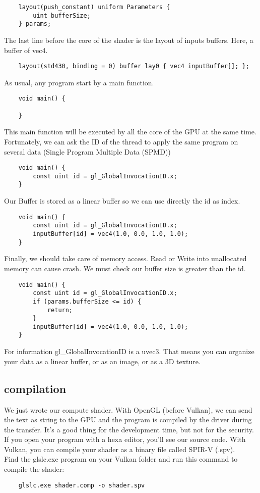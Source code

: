 \documentclass{article}
\begin{document}
\begin{lstlisting}
	layout(push_constant) uniform Parameters {
		uint bufferSize;
	} params;
\end{lstlisting}

The last line before the core of the shader is the layout of inputs buffers. Here, a buffer of vec4.

\begin{lstlisting}
	layout(std430, binding = 0) buffer lay0 { vec4 inputBuffer[]; };
\end{lstlisting}

As usual, any program start by a main function.

\begin{lstlisting}
	void main() {

	}
\end{lstlisting}

This main function will be executed by all the core of the GPU at the same time. Fortunately, we can ask the ID of the thread to apply the same program on several data (Single Program Multiple Data (SPMD))

\begin{lstlisting}
	void main() {
		const uint id = gl_GlobalInvocationID.x;
	}
\end{lstlisting}

Our Buffer is stored as a linear buffer so we can use directly the id as index.

\begin{lstlisting}
	void main() {
		const uint id = gl_GlobalInvocationID.x;
		inputBuffer[id] = vec4(1.0, 0.0, 1.0, 1.0);
	}
\end{lstlisting}

Finally, we should take care of memory access. Read or Write into unallocated memory can cause crash. We must check our buffer size is greater than the id.

\begin{lstlisting}
	void main() {
		const uint id = gl_GlobalInvocationID.x;
		if (params.bufferSize <= id) {
			return;
		}
		inputBuffer[id] = vec4(1.0, 0.0, 1.0, 1.0);
	}
\end{lstlisting}

For information gl\_GlobalInvocationID is a uvec3. That means you can organize your data as a linear buffer, or as an image, or as a 3D texture.

\subsection{compilation}
We just wrote our compute shader. With OpenGL (before Vulkan), we can send the text as string to the GPU and the program is compiled by the driver during the transfer. It's a good thing for the development time, but not for the security. If you open your program with a hexa editor, you'll see our source code. With Vulkan, you can compile your shader as a binary file called SPIR-V (.spv).\\
Find the glslc.exe program on your Vulkan folder and run this command to compile the shader:
\begin{lstlisting}
	glslc.exe shader.comp -o shader.spv
\end{lstlisting}
\end{document}
